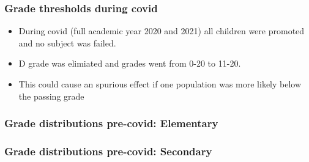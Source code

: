 \documentclass{beamer}
\begin{document}
\begin{frame}
    \label{update_scott}
    \frametitle{Grade thresholds during covid}
    \begin{itemize}
        \item During covid (full academic year 2020 and 2021) all children were promoted and no subject was failed. 
        \item D grade was elimiated and grades went from 0-20 to 11-20.
        \item This could cause an spurious effect if one population was more likely below the passing grade
    \end{itemize}
\end{frame}


\begin{frame}
    \label{update_scott}
    \frametitle{Grade distributions pre-covid: Elementary}
 {
    }
\end{frame}

\begin{frame}
    \label{update_scott}
    \frametitle{Grade distributions pre-covid: Secondary}
 {
    }
\end{frame}
\end{document}
